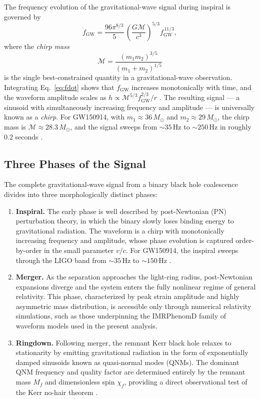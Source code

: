 The frequency evolution of the gravitational-wave signal during inspiral is governed by
\begin{equation}
	\dot{f}_{\mathrm{GW}} =
	\frac{96\pi^{8/3}}{5}\,
	\left(\frac{G\mathcal{M}}{c^3}\right)^{5/3}
	f_{\mathrm{GW}}^{\,11/3},
	\label{eq:fdot}
\end{equation}
where the \emph{chirp mass}
\begin{equation}
	\mathcal{M} = \frac{(m_1 m_2)^{3/5}}{(m_1+m_2)^{1/5}}
\end{equation}
is the single best-constrained quantity in a gravitational-wave observation.
Integrating Eq.~\eqref{eq:fdot} shows that $f_{\mathrm{GW}}$ increases monotonically with time,
and the waveform amplitude scales as $h \propto \mathcal{M}^{5/3} f_{\mathrm{GW}}^{2/3} / r$ \cite{Cutler_1994}.
The resulting signal --- a sinusoid with simultaneously increasing frequency and amplitude --- is
universally known as a \emph{chirp}. For GW150914, with $m_1 \approx 36\,M_\odot$ and
$m_2 \approx 29\,M_\odot$, the chirp mass is $\mathcal{M} \approx 28.3\,M_\odot$, and the
signal sweeps from $\sim 35$\,Hz to $\sim 250$\,Hz in roughly $0.2$ seconds \cite{Abbott2016Discovery}.

\subsection*{Three Phases of the Signal}

The complete gravitational-wave signal from a binary black hole coalescence divides into three
morphologically distinct phases:

\begin{enumerate}
	\item \textbf{Inspiral.} The early phase is well described by post-Newtonian (PN) perturbation
	theory, in which the binary slowly loses binding energy to gravitational radiation. The
	waveform is a chirp with monotonically increasing frequency and amplitude, whose phase
	evolution is captured order-by-order in the small parameter $v/c$. For GW150914, the
	inspiral sweeps through the LIGO band from $\sim 35$\,Hz to $\sim 150$\,Hz \cite{Cutler_1994, Maggiore2007}.
	
	\item \textbf{Merger.} As the separation approaches the light-ring radius, post-Newtonian
	expansions diverge and the system enters the fully nonlinear regime of general relativity.
	This phase, characterized by peak strain amplitude and highly asymmetric mass distribution,
	is accessible only through numerical relativity simulations, such as those underpinning the
	IMRPhenomD family of waveform models used in the present analysis\cite{Cutler_1994, Maggiore2007}.
	
	\item \textbf{Ringdown.} Following merger, the remnant Kerr black hole relaxes to stationarity
	by emitting gravitational radiation in the form of exponentially damped sinusoids known as
	quasi-normal modes (QNMs). The dominant QNM frequency and quality factor are determined
	entirely by the remnant mass $M_f$ and dimensionless spin $\chi_f$, providing a direct
	observational test of the Kerr no-hair theorem \cite{Cutler_1994, Maggiore2007}.
\end{enumerate}

